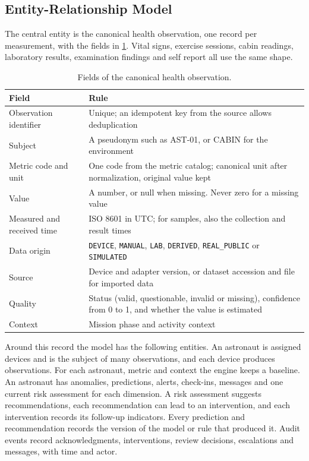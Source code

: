 \subsection{Entity-Relationship Model}
\label{subsec:entity-relationship-model}

The central entity is the canonical health observation, one record per measurement, with the fields in \ref{tab:observation}. Vital signs, exercise sessions, cabin readings, laboratory results, examination findings and self report all use the same shape.

\begin{table}[htbp]
\centering
\vspace{0.8em}
\caption{Fields of the canonical health observation.}
\label{tab:observation}
\small
\begin{tabular}{p{3.6cm}p{10.4cm}}
\hline
\textbf{Field} & \textbf{Rule} \\
\hline
Observation identifier & Unique; an idempotent key from the source allows deduplication \\
Subject & A pseudonym such as AST-01, or CABIN for the environment \\
Metric code and unit & One code from the metric catalog; canonical unit after normalization, original value kept \\
Value & A number, or null when missing. Never zero for a missing value \\
Measured and received time & ISO 8601 in UTC; for samples, also the collection and result times \\
Data origin & \texttt{DEVICE}, \texttt{MANUAL}, \texttt{LAB}, \texttt{DERIVED}, \texttt{REAL\_PUBLIC} or \texttt{SIMULATED} \\
Source & Device and adapter version, or dataset accession and file for imported data \\
Quality & Status (valid, questionable, invalid or missing), confidence from 0 to 1, and whether the value is estimated \\
Context & Mission phase and activity context \\
\hline
\end{tabular}
\vspace{1.2em}
\end{table}

Around this record the model has the following entities. An astronaut is assigned devices and is the subject of many observations, and each device produces observations. For each astronaut, metric and context the engine keeps a baseline. An astronaut has anomalies, predictions, alerts, check-ins, messages and one current risk assessment for each dimension. A risk assessment suggests recommendations, each recommendation can lead to an intervention, and each intervention records its follow-up indicators. Every prediction and recommendation records the version of the model or rule that produced it. Audit events record acknowledgments, interventions, review decisions, escalations and messages, with time and actor.


